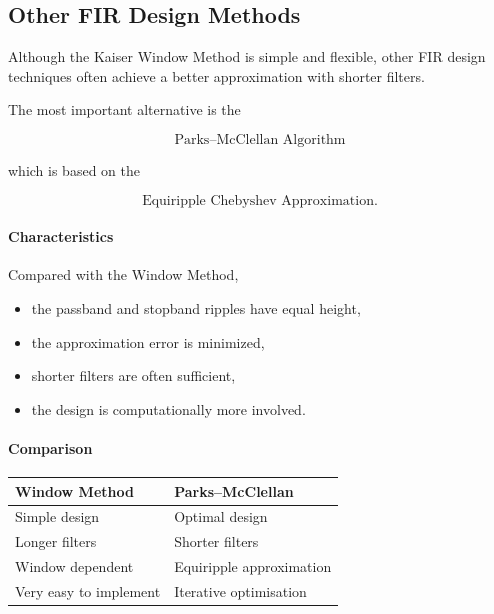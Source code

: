 \subsection{Other FIR Design Methods}

Although the Kaiser Window Method is simple and flexible, other FIR
design techniques often achieve a better approximation with shorter
filters.

The most important alternative is the

\[
\boxed{\text{Parks--McClellan Algorithm}}
\]

which is based on the

\[
\boxed{\text{Equiripple Chebyshev Approximation}.}
\]

\paragraph{Characteristics}

Compared with the Window Method,

\begin{itemize}
\item the passband and stopband ripples have equal height,
\item the approximation error is minimized,
\item shorter filters are often sufficient,
\item the design is computationally more involved.
\end{itemize}

\paragraph{Comparison}

\begin{center}
\renewcommand{\arraystretch}{1.25}
\begin{tabular}{|p{6cm}|p{6cm}|}
\hline
\textbf{Window Method}
&
\textbf{Parks--McClellan}
\\
\hline

Simple design
&
Optimal design
\\
\hline

Longer filters
&
Shorter filters
\\
\hline

Window dependent
&
Equiripple approximation
\\
\hline

Very easy to implement
&
Iterative optimisation
\\
\hline

\end{tabular}
\end{center}
\newpage